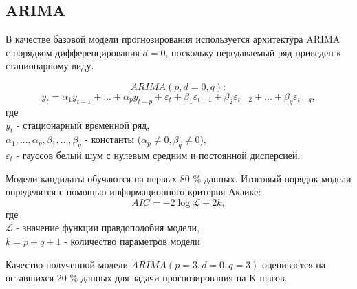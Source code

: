 \subsection{ARIMA}

В качестве базовой модели прогнозирования используется архитектура ARIMA~\cite{ARIMA} с порядком дифференцирования $d = 0$, поскольку передаваемый ряд приведен к стационарному виду.

$$ ARIMA(p, d=0, q): $$
$$ y_{t} = \alpha_{1} y_{t-1} + ... + \alpha_{p} y_{t-p} + \varepsilon_{t} + \beta_{1} \varepsilon_{t-1} + \beta_{2} \varepsilon_{t-2} + ... + \beta_{q} \varepsilon_{t-q}, $$
где \\
$y_{t}$ - стационарный временной ряд, \\
$\alpha_{1}, ..., \alpha_{p}, \beta_{1}, ..., \beta_{q}$ - константы ($\alpha_{p} \neq 0, \beta_{q} \neq 0$), \\
$ \varepsilon_{t}$ - гауссов белый шум с нулевым средним и постоянной дисперсией.

Модели-кандидаты обучаются на первых 80 \% данных. Итоговый порядок модели определятся с помощью информационного критерия Акаике:
$$ AIC = -2\log{\mathcal{L}} + 2k,$$
где \\
$\mathcal{L}$ - значение функции правдоподобия модели, \\
$k = p + q + 1$ - количество параметров модели 

Качество полученной модели $ARIMA(p=3, d= 0, q=3)$ оценивается на оставшихся 20 \% данных для задачи прогнозирования на K шагов.

\begin{table}[H]
\begin{center}
\caption{Качество моделей}
\label{arima_quality}
\end{center}
\end{table}

